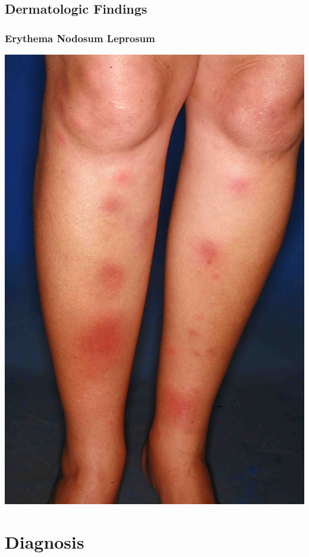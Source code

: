 \documentclass{beamer}
\begin{document}
\subsection{Dermatologic Findings}
	\begin{frame}
		\frametitle{Erythema Nodosum Leprosum}
		\centering
		\includegraphics[height=0.8\textheight,keepaspectratio]{ENL.jpg}
	\end{frame}
\section{Diagnosis}
\end{document}

